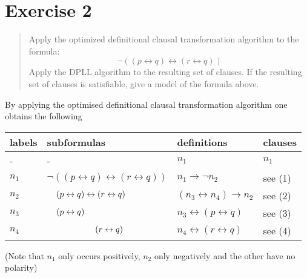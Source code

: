 \documentclass[11pt,a4paper]{article}
\begin{document}
\section*{Exercise 2}
\begin{quote}
Apply the optimized definitional clausal transformation algorithm to the formula:
\begin{equation*}
\neg((p\leftrightarrow q) \leftrightarrow (r \leftrightarrow q))
\end{equation*}
Apply the DPLL algorithm to the resulting set of clauses. If the resulting set of clauses is satisfiable,
give a model of the formula above.
\end{quote}
By applying the optimised definitional clausal transformation algorithm one obtains the following 
\begin{center}
\begin{tabular}{| l | l | l | l | }
\hline
labels & subformulas & definitions & clauses \\
\hline
- & - & $n_1$ & $n_1$ \\
$n_1$ & $\neg((p\leftrightarrow q) \leftrightarrow (r \leftrightarrow q))$ & $n_1 \to \neg n_2$ & see (1) \\
$n_2$ & $\textcolor{white}{\neg(}(p\leftrightarrow q) \leftrightarrow (r \leftrightarrow q)\textcolor{white}{)}$  &  $(n_3 \leftrightarrow n_4) \to n_2$ & see (2) \\
$n_3$ & $\textcolor{white}{\neg(}(p\leftrightarrow q) \textcolor{white}{\leftrightarrow (r \leftrightarrow q))}$ & $n_3 \leftrightarrow (p \leftrightarrow q) $ & see (3) \\
$n_4$ & $\textcolor{white}{\neg((p\leftrightarrow q) \leftrightarrow} (r \leftrightarrow q)\textcolor{white}{)}$  & $n_4 \leftrightarrow (r \leftrightarrow q) $  & see (4)\\
\hline
\end{tabular}
\end{center}
(Note that $n_1$ only occurs positively, $n_2$ only negatively and the other have no polarity)\\
\end{document}
